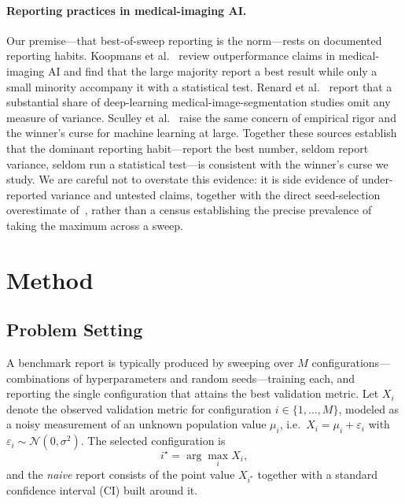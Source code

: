 \documentclass[conference]{IEEEtran}
\begin{document}
\paragraph{Reporting practices in medical-imaging AI.}
Our premise---that best-of-sweep reporting is the norm---rests on documented
reporting habits. Koopmans et al.~\cite{koopmans2025false} review outperformance
claims in medical-imaging AI and find that the large majority report a best
result while only a small minority accompany it with a statistical test. Renard
et al.~\cite{renard2020variability} report that a substantial share of
deep-learning medical-image-segmentation studies omit any measure of variance.
Sculley et al.~\cite{sculley2018winners} raise the same concern of empirical
rigor and the winner's curse for machine learning at large. Together these
sources establish that the dominant reporting habit---report the best number,
seldom report variance, seldom run a statistical test---is consistent with the
winner's curse we study. We are careful not to overstate this evidence: it is
side evidence of under-reported variance and untested claims, together with the
direct seed-selection overestimate of~\cite{akesson2024random}, rather than a
census establishing the precise prevalence of taking the maximum across a sweep.

\section{Method}
\label{sec:method}

\subsection{Problem Setting}
A benchmark report is typically produced by sweeping over $M$ configurations---combinations of hyperparameters and random seeds---training each, and reporting the single configuration that attains the best validation metric. Let $X_i$ denote the observed validation metric for configuration $i \in \{1, \dots, M\}$, modeled as a noisy measurement of an unknown population value $\mu_i$, i.e.\ $X_i = \mu_i + \varepsilon_i$ with $\varepsilon_i \sim \mathcal{N}(0, \sigma^2)$. The selected configuration is
\begin{equation}
i^\star = \arg\max_{i} X_i ,
\end{equation}
and the \emph{naive} report consists of the point value $X_{i^\star}$ together with a standard confidence interval (CI) built around it.
\end{document}
